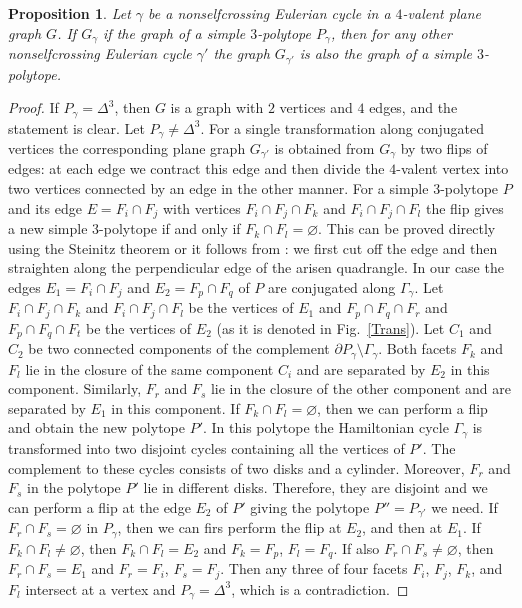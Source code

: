 \documentclass[12pt]{amsart}
\newtheorem{proposition}[formula]{Proposition}
\theoremstyle{definition}
\theoremstyle{remark}
\begin{document}
\begin{proposition}
Let $\gamma$ be a nonselfcrossing Eulerian cycle in a $4$-valent plane graph $G$. If $G_\gamma$ if the graph of a 
simple $3$-polytope $P_\gamma$, then for any other nonselfcrossing Eulerian cycle $\gamma'$ the graph
$G_{\gamma'}$ is also the graph of a simple $3$-polytope.
\end{proposition}
\begin{proof}
If $P_\gamma=\Delta^3$, then $G$ is a graph with $2$ vertices and $4$ edges, and the statement is clear.
Let $P_\gamma\ne\Delta^3$.
For a single transformation along conjugated vertices the corresponding plane graph $G_{\gamma'}$
is obtained from $G_\gamma$ by two flips of edges: at each edge we contract this edge and then divide the 
$4$-valent vertex into two vertices connected by an edge in the other manner. For a simple $3$-polytope $P$ and
its edge $E=F_i\cap F_j$ with vertices $F_i\cap F_j\cap F_k$ and $F_i\cap F_j\cap F_l$ the flip gives a new 
simple $3$-polytope if and only if $F_k\cap F_l=\varnothing$. This can be proved directly using the Steinitz theorem or it follows
from \cite[Theorem 11.4]{E19}: we first cut off the edge and then straighten along the perpendicular edge of the arisen quadrangle.
In our case the edges $E_1=F_i\cap F_j$ and $E_2=F_p\cap F_q$ of $P$ are conjugated along $\Gamma_\gamma$.
Let $F_i\cap F_j\cap F_k$ and $F_i\cap F_j\cap F_l$ be the 
vertices of $E_1$ and $F_p\cap F_q\cap F_r$ and $F_p\cap F_q\cap F_t$
be the vertices of $E_2$ (as it is denoted in Fig.~\ref{Trans}). Let $C_1$ and $C_2$  be two connected components of the complement 
$\partial P_\gamma\setminus\Gamma_\gamma$.  Both facets $F_k$ and $F_l$ lie in the closure of the same
component $C_i$ and are separated by $E_2$ in this component. Similarly, $F_r$ and $F_s$ lie in the closure of the 
other component and are separated by $E_1$ in this component. If $F_k\cap F_l=\varnothing$, then we can perform a flip
and obtain the new polytope $P'$. In this polytope the Hamiltonian cycle $\Gamma_\gamma$ is transformed into two disjoint
cycles containing all the vertices of $P'$. The complement to these cycles consists of two disks and a cylinder. Moreover, $F_r$ 
and $F_s$ in the polytope $P'$ lie in different disks. Therefore, they are disjoint and we can perform a flip at the edge
$E_2$ of $P'$ giving the polytope $P''=P_{\gamma'}$ we need. If $F_r\cap F_s=\varnothing$ in $P_\gamma$, then we can firs perform 
the flip at $E_2$, and then at $E_1$. If $F_k\cap F_l\ne\varnothing$,
then  $F_k\cap F_l=E_2$ and $F_k=F_p$, $F_l=F_q$. If also $F_r\cap F_s\ne\varnothing$, then
$F_r\cap F_s=E_1$ and $F_r=F_i$, $F_s=F_j$. Then any three of four facets $F_i$, $F_j$, $F_k$, and  $F_l$
intersect at a vertex and $P_\gamma=\Delta^3$, which is a contradiction. 


\end{proof}
\end{document}
